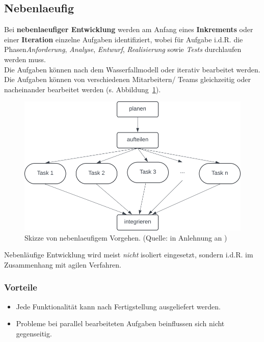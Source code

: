 \subsection{Nebenlaeufig}

\noindent
Bei \textbf{nebenlaeufiger Entwicklung} werden am Anfang eines \textbf{Inkrements} oder einer \textbf{Iteration} einzelne Aufgaben identifiziert, wobei für Aufgabe i.d.R. die Phasen\textit{Anforderung}, \textit{Analyse},  \textit{Entwurf}, \textit{Realisierung} sowie \textit{Tests} durchlaufen werden muss.\\
Die Aufgaben können nach dem Wasserfallmodell oder iterativ bearbeitet werden.\\
Die Aufgaben können von verschiedenen Mitarbeitern/ Teams gleichzeitig oder nacheinander bearbeitet werden (s. Abbildung~\ref{fig:nebenlaeufig}).\\


\begin{figure}
    \centering
    \includegraphics[scale=0.4]{chapters/Prozessmodelle/img/nebenlaeufigkeit}
    \caption{Skizze von nebenlaeufigem Vorgehen. (Quelle: in Anlehnung an \cite[29]{Wed09})}
    \label{fig:nebenlaeufig}
\end{figure}


\noindent
Nebenläufige Entwicklung wird meist \textit{nicht} isoliert eingesetzt, sondern i.d.R. im Zusammenhang mit agilen Verfahren.

\subsubsection*{Vorteile}

\begin{itemize}
    \item Jede Funktionalität kann nach Fertigstellung ausgeliefert werden.
    \item Probleme bei parallel bearbeiteten Aufgaben beinflussen sich nicht gegenseitig.
\end{itemize}

